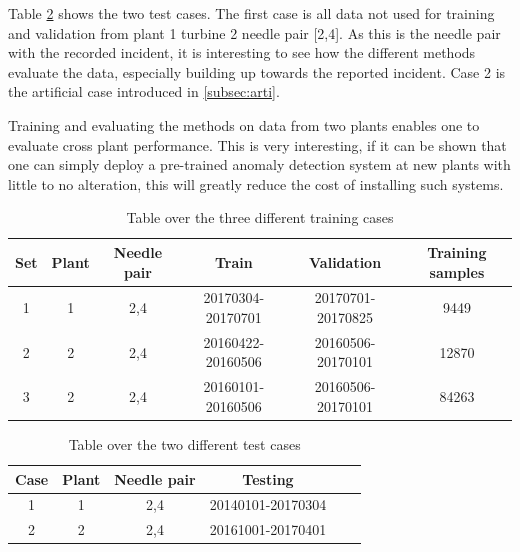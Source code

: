         Table \ref{tab:test_cases} shows the two test cases. The first case is all data not used for training and validation from plant 1 turbine 2 needle pair [2,4]. As this is the needle pair with the recorded incident, it is interesting to see how the different methods evaluate the data, especially building up towards the reported incident. Case 2 is the artificial case introduced in \ref{subsec:arti}.
        
        
        Training and evaluating the methods on data from two plants enables one to evaluate cross plant performance. This is very interesting, if it can be shown that one can simply deploy a pre-trained anomaly detection system at new plants with little to no alteration, this will greatly reduce the cost of installing such systems. 
        \begin{table}[]
            \centering
            \begin{tabular}{|c|c|c|c|c|c|}
                \hline
                Set    & Plant & Needle pair   & Train             & Validation        & Training samples\\ \hline
                1       & 1     & 2,4           & 20170304-20170701 & 20170701-20170825 & 9449\\ \hline
                2       & 2     & 2,4           & 20160422-20160506 & 20160506-20170101 & 12870\\ \hline
                3       & 2     & 2,4           & 20160101-20160506 & 20160506-20170101 & 84263\\ \hline
            \end{tabular}
            \caption{Table over the three different training cases}
            \label{tab:training_cases}
        \end{table}
        
        \begin{table}[]
            \centering
            \begin{tabular}{|c|c|c|c|c|c|}
                \hline
                Case    & Plant & Needle pair   & Testing               \\ \hline
                1       & 1     & 2,4           & 20140101-20170304     \\ \hline
                2       & 2     & 2,4           & 20161001-20170401     \\ \hline
            \end{tabular}
            \caption{Table over the two different test cases}
            \label{tab:test_cases}
        \end{table}
        

